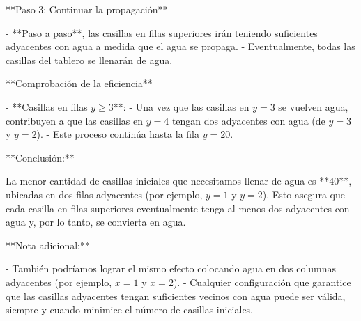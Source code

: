 \documentclass[11pt]{scrartcl}
\begin{document}
\begin{problem}
\begin{hint}
\begin{solu}
**Paso 3: Continuar la propagación**

- **Paso a paso**, las casillas en filas superiores irán teniendo suficientes adyacentes con agua a medida que el agua se propaga.
- Eventualmente, todas las casillas del tablero se llenarán de agua.

**Comprobación de la eficiencia**

- **Casillas en filas $y \geq 3$**:
  - Una vez que las casillas en $y = 3$ se vuelven agua, contribuyen a que las casillas en $y = 4$ tengan dos adyacentes con agua (de $y = 3$ y $y = 2$).
  - Este proceso continúa hasta la fila $y = 20$.

**Conclusión:**

La menor cantidad de casillas iniciales que necesitamos llenar de agua es **40**, ubicadas en dos filas adyacentes (por ejemplo, $y = 1$ y $y = 2$). Esto asegura que cada casilla en filas superiores eventualmente tenga al menos dos adyacentes con agua y, por lo tanto, se convierta en agua.

**Nota adicional:**

- También podríamos lograr el mismo efecto colocando agua en dos columnas adyacentes (por ejemplo, $x = 1$ y $x = 2$).
- Cualquier configuración que garantice que las casillas adyacentes tengan suficientes vecinos con agua puede ser válida, siempre y cuando minimice el número de casillas iniciales.

\end{solu}
\end{hint}
\end{problem}
\end{document}
